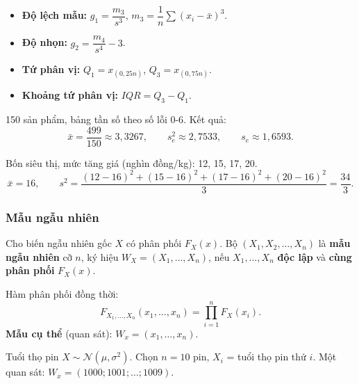 \documentclass[12pt,a4paper]{article}
\begin{document}
\begin{congthuc}[title={Độ lệch, độ nhọn, tứ phân vị}]
\begin{itemize}
  \item \textbf{Độ lệch mẫu:} $g_1 = \dfrac{m_3}{s^3}$, $m_3 = \dfrac{1}{n}\displaystyle\sum(x_i-\bar{x})^3$.
  \item \textbf{Độ nhọn:} $g_2 = \dfrac{m_4}{s^4} - 3$.
  \item \textbf{Tứ phân vị:} $Q_1 = x_{(0{,}25n)}$, $Q_3 = x_{(0{,}75n)}$.
  \item \textbf{Khoảng tứ phân vị:} $IQR = Q_3 - Q_1$.
\end{itemize}
\end{congthuc}

\begin{vidu}[title={Số lỗi trên sản phẩm đúc}]
150 sản phẩm, bảng tần số theo số lỗi 0-6. Kết quả:
\[
  \bar{x} = \dfrac{499}{150} \approx 3{,}3267, \qquad
  s_e^2 \approx 2{,}7533, \qquad
  s_e \approx 1{,}6593.
\]
\end{vidu}

\begin{vidu}[title={Phương sai mẫu hiệu chỉnh - giá tăng}]
Bốn siêu thị, mức tăng giá (nghìn đồng/kg): 12, 15, 17, 20.
\[
  \bar{x} = 16, \qquad s^2 = \dfrac{(12-16)^2 + (15-16)^2 + (17-16)^2 + (20-16)^2}{3} = \dfrac{34}{3}.
\]
\end{vidu}

\subsubsection{Mẫu ngẫu nhiên}

\begin{dinhnghia}[title={Mẫu ngẫu nhiên}]
  Cho biến ngẫu nhiên gốc $X$ có phân phối $F_X(x)$. Bộ $(X_1, X_2, \ldots, X_n)$ là \textbf{mẫu ngẫu nhiên} cỡ $n$, ký hiệu $W_X = (X_1, \ldots, X_n)$, nếu $X_1, \ldots, X_n$ \textbf{độc lập} và \textbf{cùng phân phối} $F_X(x)$.

  Hàm phân phối đồng thời:
  \[
    F_{X_1,\ldots,X_n}(x_1,\ldots,x_n) = \prod_{i=1}^n F_X(x_i).
  \]
  \textbf{Mẫu cụ thể} (quan sát): $W_x = (x_1, \ldots, x_n)$.
\end{dinhnghia}

\begin{vidu}[title={Pin loại A}]
Tuổi thọ pin $X \sim \mathcal{N}(\mu, \sigma^2)$. Chọn $n=10$ pin, $X_i$ = tuổi thọ pin thứ $i$. Một quan sát: $W_x = (1000; 1001; \ldots; 1009)$.
\end{vidu}
\end{document}
